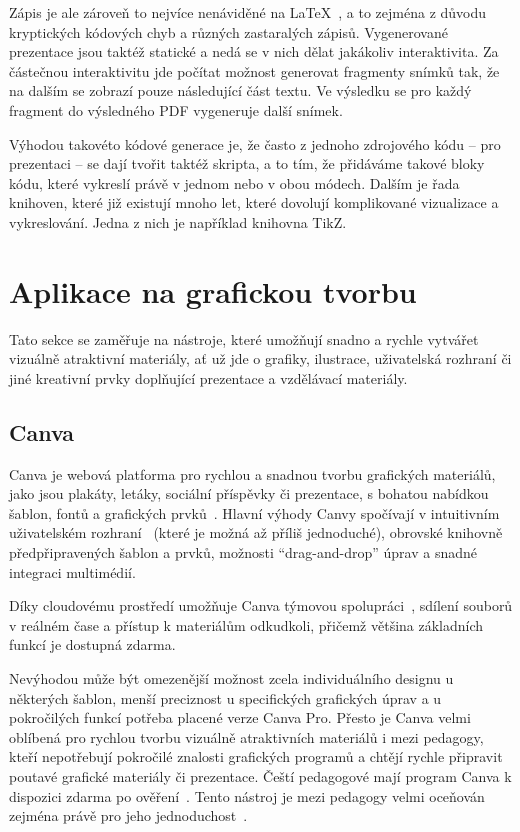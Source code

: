 Zápis je ale zároveň to nejvíce nenáviděné na \LaTeX~\cite{latex_reddit}, a to zejména z důvodu kryptických kódových chyb a různých zastaralých zápisů.
Vygenerované prezentace jsou taktéž statické a nedá se v nich dělat jakákoliv interaktivita. 
Za částečnou interaktivitu jde počítat možnost generovat fragmenty snímků tak, že na dalším se zobrazí pouze následující část textu.
Ve výsledku se pro každý fragment do výsledného PDF vygeneruje další snímek.

Výhodou takovéto kódové generace je, že často z jednoho zdrojového kódu -- pro prezentaci -- se dají tvořit taktéž skripta, a to tím, že přidáváme takové bloky kódu, které vykreslí právě v jednom nebo v obou módech.
Dalším je řada knihoven, které již existují mnoho let, které dovolují komplikované vizualizace a vykreslování.
Jedna z nich je například knihovna TikZ. 

\section{Aplikace na grafickou tvorbu}\label{text:analyza/grafika}

Tato sekce se zaměřuje na nástroje, které umožňují snadno a rychle vytvářet vizuálně atraktivní materiály, ať už jde o grafiky, ilustrace, uživatelská rozhraní či jiné kreativní prvky doplňující prezentace a vzdělávací materiály.

\subsection{Canva}\label{text:canva}

Canva je webová platforma pro rychlou a snadnou tvorbu grafických materiálů, jako jsou plakáty, letáky, sociální příspěvky či prezentace, s bohatou nabídkou šablon, fontů a grafických prvků~\cite{canva_website}. 
Hlavní výhody Canvy spočívají v intuitivním uživatelském rozhraní~\cite{canva_recenze} (které je možná až příliš jednoduché), obrovské knihovně předpřipravených šablon a prvků, možnosti \enquote{drag-and-drop} úprav a snadné integraci multimédií.

Díky cloudovému prostředí umožňuje Canva týmovou spolupráci~\cite{canva_live_help, canva_live_features}, sdílení souborů v reálném čase a přístup k materiálům odkudkoli, přičemž většina základních funkcí je dostupná zdarma. 

Nevýhodou může být omezenější možnost zcela individuálního designu u některých šablon, menší preciznost u specifických grafických úprav a u pokročilých funkcí potřeba placené verze Canva Pro. 
Přesto je Canva velmi oblíbená pro rychlou tvorbu vizuálně atraktivních materiálů i mezi pedagogy, kteří nepotřebují pokročilé znalosti grafických programů a chtějí rychle připravit poutavé grafické materiály či prezentace.
Čeští pedagogové mají program Canva k dispozici zdarma po ověření~\cite{canva_education}. Tento nástroj je mezi pedagogy velmi oceňován zejména právě pro jeho jednoduchost~\cite{canva_facebook}.


